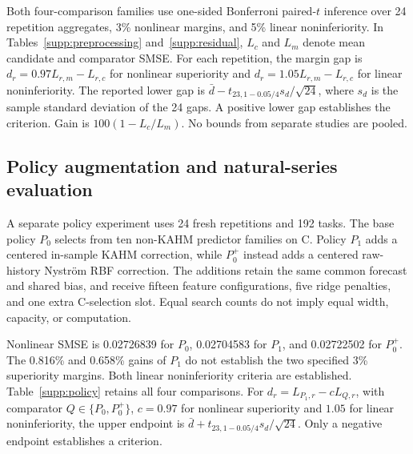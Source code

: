 Both four-comparison families use one-sided Bonferroni paired-$t$ inference over 24 repetition aggregates, 3\% nonlinear margins, and 5\% linear noninferiority. In Tables~\ref{supp:preprocessing} and~\ref{supp:residual}, $L_c$ and $L_m$ denote mean candidate and comparator SMSE. For each repetition, the margin gap is $d_r=0.97L_{r,m}-L_{r,c}$ for nonlinear superiority and $d_r=1.05L_{r,m}-L_{r,c}$ for linear noninferiority. The reported lower gap is $\bar d-t_{23,1-0.05/4}s_d/\sqrt{24}$, where $s_d$ is the sample standard deviation of the 24 gaps. A positive lower gap establishes the criterion. Gain is $100(1-L_c/L_m)$. No bounds from separate studies are pooled.

\begin{table}[htbp]\centering\small
\caption{Complete primary family for preprocessing with dimension selection. The displayed bounds and decisions retain that study's margin convention and 24-repetition inferential unit. The nonlinear unfavorable comparisons are retained.}\label{supp:preprocessing}
\end{table}
\begin{table}[htbp]\centering\small
\caption{Complete primary family for the same-cohort residual-target reproduction. This contributes no additional independent cohort. The three nonlinear comparisons use a 3\% margin and the linear comparison a 5\% noninferiority tolerance.}\label{supp:residual}
\end{table}
\FloatBarrier

\subsection{Policy augmentation and natural-series evaluation}
A separate policy experiment uses 24 fresh repetitions and 192 tasks. The base policy $P_0$ selects from ten non-KAHM predictor families on C. Policy $P_1$ adds a centered in-sample KAHM correction, while $P_0^+$ instead adds a centered raw-history Nystr\"om RBF correction. The additions retain the same common forecast and shared bias, and receive fifteen feature configurations, five ridge penalties, and one extra C-selection slot. Equal search counts do not imply equal width, capacity, or computation.

Nonlinear SMSE is 0.02726839 for $P_0$, 0.02704583 for $P_1$, and 0.02722502 for $P_0^+$. The 0.816\% and 0.658\% gains of $P_1$ do not establish the two specified 3\% superiority margins. Both linear noninferiority criteria are established. Table~\ref{supp:policy} retains all four comparisons. For $d_r=L_{P_1,r}-cL_{Q,r}$, with comparator $Q\in\{P_0,P_0^+\}$, $c=0.97$ for nonlinear superiority and $1.05$ for linear noninferiority, the upper endpoint is $\bar d+t_{23,1-0.05/4}s_d/\sqrt{24}$. Only a negative endpoint establishes a criterion.

